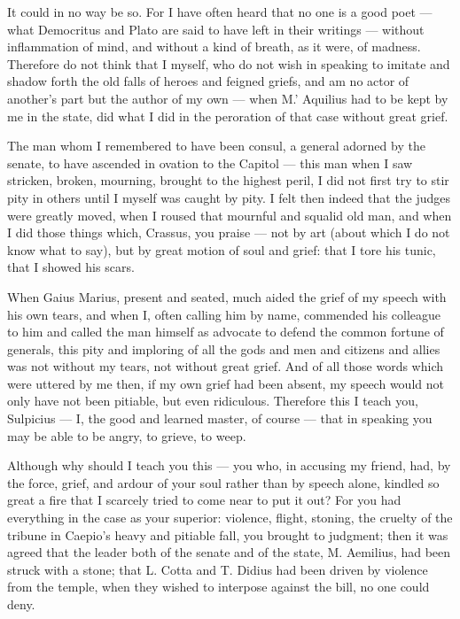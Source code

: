  It could in no way be so. For I have often heard that no one is a good poet — what Democritus and Plato are said to have left in their writings — without inflammation of mind, and without a kind of breath, as it were, of madness. Therefore do not think that I myself, who do not wish in speaking to imitate and shadow forth the old falls of heroes and feigned griefs, and am no actor of another's part but the author of my own — when M.' Aquilius had to be kept by me in the state, did what I did in the peroration of that case without great grief.

 The man whom I remembered to have been consul, a general adorned by the senate, to have ascended in ovation to the Capitol — this man when I saw stricken, broken, mourning, brought to the highest peril, I did not first try to stir pity in others until I myself was caught by pity. I felt then indeed that the judges were greatly moved, when I roused that mournful and squalid old man, and when I did those things which, Crassus, you praise — not by art (about which I do not know what to say), but by great motion of soul and grief: that I tore his tunic, that I showed his scars.

 When Gaius Marius, present and seated, much aided the grief of my speech with his own tears, and when I, often calling him by name, commended his colleague to him and called the man himself as advocate to defend the common fortune of generals, this pity and imploring of all the gods and men and citizens and allies was not without my tears, not without great grief. And of all those words which were uttered by me then, if my own grief had been absent, my speech would not only have not been pitiable, but even ridiculous. Therefore this I teach you, Sulpicius — I, the good and learned master, of course — that in speaking you may be able to be angry, to grieve, to weep.

 Although why should I teach you this — you who, in accusing my friend, had, by the force, grief, and ardour of your soul rather than by speech alone, kindled so great a fire that I scarcely tried to come near to put it out? For you had everything in the case as your superior: violence, flight, stoning, the cruelty of the tribune in Caepio's heavy and pitiable fall, you brought to judgment; then it was agreed that the leader both of the senate and of the state, M. Aemilius, had been struck with a stone; that L. Cotta and T. Didius had been driven by violence from the temple, when they wished to interpose against the bill, no one could deny.

